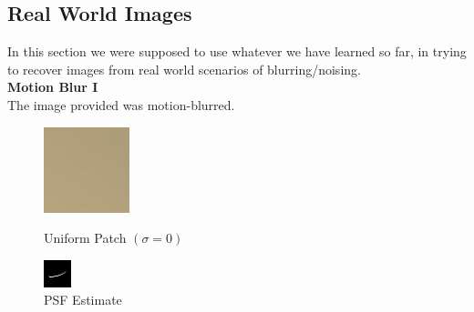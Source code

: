 \documentclass{article}
\begin{document}
    \pagebreak


    
    \subsection*{Real World Images}
    In this section we were supposed to use whatever we have learned so far, in trying to recover images from real world scenarios of blurring/noising.\\[1pt]
    
    \textbf{Motion Blur I}\\
    The image provided was motion-blurred.\\[3pt]
    \begin{figure}[!htb]
     \centering
      \includegraphics[scale=2.2]{./real_world/shan/uniform.png}
      \caption{Uniform Patch \((\sigma = 0)\)}
    \endminipage\hfill
    \centering
      \includegraphics[scale=3.5]{./real_world/shan/psf.png}
      \caption{PSF Estimate}
    \endminipage\hfill
    \end{figure}
\end{document}
